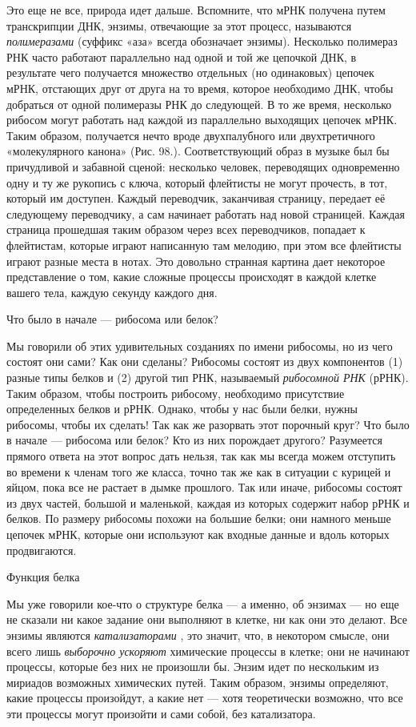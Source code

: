 \documentclass[../main.tex]{subfiles}
\begin{document}
Это еще не все, природа идет дальше. Вспомните, что мРНК получена путем транскрипции ДНК, энзимы, отвечающие за этот процесс, называются \emph{полимеразами} (суффикс «аза» всегда обозначает энзимы). Несколько полимераз РНК часто работают параллельно над одной и той же цепочкой ДНК, в результате чего получается множество отдельных (но одинаковых) цепочек мРНК, отстающих друг от друга на то время, которое необходимо ДНК, чтобы добраться от одной полимеразы РНК до следующей. В то же время, несколько рибосом могут работать над каждой из параллельно выходящих цепочек мРНК. Таким образом, получается нечто вроде двухпалубного или двухтретичного «молекулярного канона» (Рис. 98.). Соответствующий образ в музыке был бы причудливой и забавной сценой: несколько человек, переводящих одновременно одну и ту же рукопись с ключа, который флейтисты не могут прочесть, в тот, который им доступен. Каждый переводчик, заканчивая страницу, передает её следующему переводчику, а сам начинает работать над новой страницей. Каждая страница прошедшая таким образом через всех переводчиков, попадает к флейтистам, которые играют написанную там мелодию, при этом все флейтисты играют разные места в нотах. Это довольно странная картина дает некоторое представление о том, какие сложные процессы происходят в каждой клетке вашего тела, каждую секунду каждого дня.

Что было в начале --- рибосома или белок?

Мы говорили об этих удивительных созданиях по имени рибосомы, но из чего состоят они сами? Как они сделаны? Рибосомы состоят из двух компонентов (1) разные типы белков и (2) другой тип РНК, называемый \emph{рибосомной РНК} (рРНК). Таким образом, чтобы построить рибосому, необходимо присутствие определенных белков и рРНК. Однако, чтобы у нас были белки, нужны рибосомы, чтобы их сделать! Так как же разорвать этот порочный круг? Что было в начале --- рибосома или белок? Кто из них порождает другого? Разумеется прямого ответа на этот вопрос дать нельзя, так как мы всегда можем отступить во времени к членам того же класса, точно так же как в ситуации с курицей и яйцом, пока все не растает в дымке прошлого. Так или иначе, рибосомы состоят из двух частей, большой и маленькой, каждая из которых содержит набор рРНК и белков. По размеру рибосомы похожи на большие белки; они намного меньше цепочек мРНК, которые они используют как входные данные и вдоль которых продвигаются.

Функция белка

Мы уже говорили кое-что о структуре белка --- а именно, об энзимах --- но еще не сказали ни какое задание они выполняют в клетке, ни как они это делают. Все энзимы являются \emph{катализаторами} , это значит, что, в некотором смысле, они всего лишь \emph{выборочно ускоряют} химические процессы в клетке; они не начинают процессы, которые без них не произошли бы. Энзим идет по нескольким из мириадов возможных химических путей. Таким образом, энзимы определяют, какие процессы произойдут, а какие нет --- хотя теоретически возможно, что все эти процессы могут произойти и сами собой, без катализатора.
\end{document}
